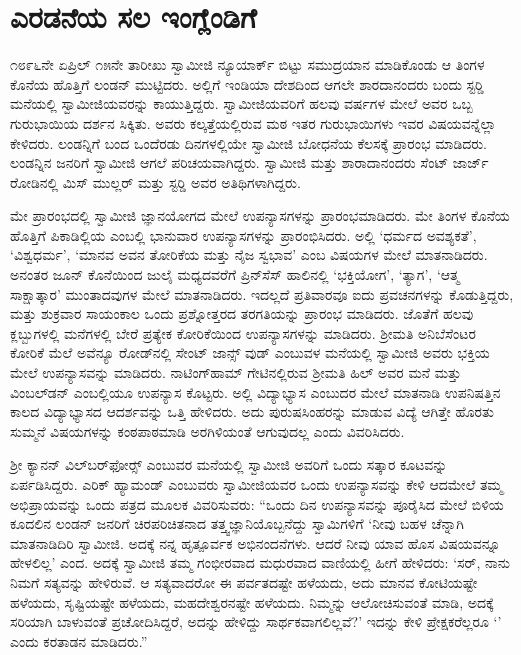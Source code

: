 
\chapter{ಎರಡನೆಯ ಸಲ ಇಂಗ್ಲೆಂಡಿಗೆ }

 ೧೮೯೬ನೇ ಏಪ್ರಿಲ್ ೧೫ನೇ ತಾರೀಖು ಸ್ವಾಮೀಜಿ ನ್ಯೂಯಾರ್ಕ್ ಬಿಟ್ಟು ಸಮುದ್ರಯಾನ ಮಾಡಿಕೊಂಡು ಆ ತಿಂಗಳ ಕೊನೆಯ ಹೊತ್ತಿಗೆ ಲಂಡನ್ ಮುಟ್ಟಿದರು. ಅಲ್ಲಿಗೆ ಇಂಡಿಯಾ ದೇಶದಿಂದ ಆಗಲೇ ಶಾರದಾನಂದರು ಬಂದು ಸ್ಟರ‍್ಡಿ ಮನೆಯಲ್ಲಿ ಸ್ವಾಮೀಜಿಯವರನ್ನು ಕಾಯುತ್ತಿದ್ದರು. ಸ್ವಾಮೀಜಿಯವರಿಗೆ ಹಲವು ವರ್ಷಗಳ ಮೇಲೆ ಅವರ ಒಬ್ಬ ಗುರುಭಾಯಿಯ ದರ್ಶನ ಸಿಕ್ಕಿತು. ಅವರು ಕಲ್ಕತ್ತೆಯಲ್ಲಿರುವ ಮಠ ಇತರ ಗುರುಭಾಯಿಗಳು ಇವರ ವಿಷಯವನ್ನೆಲ್ಲಾ ಕೇಳಿದರು. ಲಂಡನ್ನಿಗೆ ಬಂದ ಒಂದೆರಡು ದಿನಗಳಲ್ಲಿಯೇ ಸ್ವಾಮೀಜಿ ಬೋಧನೆಯ ಕೆಲಸಕ್ಕೆ ಪ್ರಾರಂಭ ಮಾಡಿದರು. ಲಂಡನ್ನಿನ ಜನರಿಗೆ ಸ್ವಾಮೀಜಿ ಆಗಲೆ ಪರಿಚಯವಾಗಿದ್ದರು. ಸ್ವಾಮೀಜಿ ಮತ್ತು ಶಾರಾದಾನಂದರು ಸೆಂಟ್ ಜಾರ್ಜ್ ರೋಡಿನಲ್ಲಿ ಮಿಸ್ ಮುಲ್ಲರ್ ಮತ್ತು ಸ್ಟರ‍್ಡಿ ಅವರ ಅತಿಥಿಗಳಾಗಿದ್ದರು. 

 ಮೇ ಪ್ರಾರಂಭದಲ್ಲಿ ಸ್ವಾಮೀಜಿ ಜ್ಞಾನಯೋಗದ ಮೇಲೆ ಉಪನ್ಯಾಸಗಳನ್ನು ಪ್ರಾರಂಭಮಾಡಿದರು. ಮೇ ತಿಂಗಳ ಕೊನೆಯ ಹೊತ್ತಿಗೆ ಪಿಕಾಡಿಲ್ಲಿಯ  ಎಂಬಲ್ಲಿ ಭಾನುವಾರ ಉಪನ್ಯಾಸಗಳನ್ನು ಪ್ರಾರಂಭಿಸಿದರು. ಅಲ್ಲಿ ‘ಧರ್ಮದ ಅವಶ್ಯಕತೆ’, ‘ವಿಶ್ವಧರ್ಮ’, ‘ಮಾನವ ಅವನ ತೋರಿಕೆಯ ಮತ್ತು ನೈಜ ಸ್ವಭಾವ’ ಎಂಬ ವಿಷಯಗಳ ಮೇಲೆ ಮಾತನಾಡಿದರು. ಅನಂತರ ಜೂನ್ ಕೊನೆಯಿಂದ ಜುಲೈ ಮಧ್ಯದವರೆಗೆ ಪ್ರಿನ್‍ಸೆಸ್ ಹಾಲಿನಲ್ಲಿ ‘ಭಕ್ತಿಯೋಗ’, ‘ತ್ಯಾಗ’, ‘ಆತ್ಮ ಸಾಕ್ಷಾತ್ಕಾರ’ ಮುಂತಾದವುಗಳ ಮೇಲೆ ಮಾತನಾಡಿದರು. ಇದಲ್ಲದೆ ಪ್ರತಿವಾರವೂ ಐದು ಪ್ರವಚನಗಳನ್ನು ಕೊಡುತ್ತಿದ್ದರು, ಮತ್ತು ಶುಕ್ರವಾರ ಸಾಯಂಕಾಲ ಒಂದು ಪ್ರಶ್ನೋತ್ತರದ ತರಗತಿಯನ್ನು ಪ್ರಾರಂಭ ಮಾಡಿದರು. ಜೊತೆಗೆ ಹಲವು ಕ್ಲಬ್ಬುಗಳಲ್ಲಿ ಮನೆಗಳಲ್ಲಿ ಬೇರೆ ಪ್ರತ್ಯೇಕ ಕೋರಿಕೆಯಿಂದ ಉಪನ್ಯಾಸಗಳನ್ನು ಮಾಡಿದರು. ಶ‍್ರೀಮತಿ ಅನಿಬೆಸೆಂಟರ ಕೋರಿಕೆ ಮೆಲೆ ಅವೆನ್ಯೂ ರೋಡ್‍ನಲ್ಲಿ ಸೇಂಟ್ ಜಾನ್ಸ್ ವುಡ್ ಎಂಬುವಳ ಮನೆಯಲ್ಲಿ ಸ್ವಾಮೀಜಿ ಅವರು ಭಕ್ತಿಯ ಮೇಲೆ ಉಪನ್ಯಾಸವನ್ನು ಮಾಡಿದರು. ನಾಟಿಂಗ್‍ಹಾಮ್ ಗೇಟಿನಲ್ಲಿರುವ ಶ‍್ರೀಮತಿ ಹಿಲ್ ಅವರ ಮನೆ ಮತ್ತು ವಿಂಬಲ್‍ಡನ್ ಎಂಬಲ್ಲಿಯೂ ಉಪನ್ಯಾಸ ಕೊಟ್ಟರು. ಅಲ್ಲಿ ವಿದ್ಯಾಭ್ಯಾಸ ಎಂಬುದರ ಮೇಲೆ ಮಾತನಾಡಿ ಉಪನಿಷತ್ತಿನ ಕಾಲದ ವಿದ್ಯಾಭ್ಯಾಸದ ಆದರ್ಶವನ್ನು ಒತ್ತಿ ಹೇಳಿದರು. ಅದು ಪುರುಷಸಿಂಹರನ್ನು ಮಾಡುವ ವಿದ್ಯೆ ಆಗಿತ್ತೇ ಹೊರತು ಸುಮ್ಮನೆ ವಿಷಯಗಳನ್ನು ಕಂಠಪಾಠಮಾಡಿ ಅರಗಿಳಿಯಂತೆ ಆಗುವುದಲ್ಲ ಎಂದು ವಿವರಿಸಿದರು. 

 ಶ‍್ರೀ ಕ್ಯಾನನ್ ವಿಲ್‌ಬರ್‌ಫೋರ್ಸ್‍ ಎಂಬುವರ ಮನೆಯಲ್ಲಿ ಸ್ವಾಮೀಜಿ ಅವರಿಗೆ ಒಂದು ಸತ್ಕಾರ ಕೂಟವನ್ನು ಏರ್ಪಡಿಸಿದ್ದರು. ಎರಿಕ್ ಹ್ಯಾಮಂಡ್ ಎಂಬುವರು ಸ್ವಾಮೀಜಿಯವರ ಒಂದು ಉಪನ್ಯಾಸವನ್ನು ಕೇಳಿ ಆದಮೇಲೆ ತಮ್ಮ ಅಭಿಪ್ರಾಯವನ್ನು ಒಂದು ಪತ್ರದ ಮೂಲಕ ವಿವರಿಸುವರು: “ಒಂದು ದಿನ ಉಪನ್ಯಾಸವನ್ನು ಪೂರೈಸಿದ ಮೇಲೆ ಬಿಳಿಯ ಕೂದಲಿನ ಲಂಡನ್ ಜನರಿಗೆ ಚಿರಪರಿಚಿತನಾದ ತತ್ತ್ವಜ್ಞಾನಿಯೊಬ್ಬನೆದ್ದು ಸ್ವಾಮಿಗಳಿಗೆ ‘ನೀವು ಬಹಳ ಚೆನ್ನಾಗಿ ಮಾತನಾಡಿದಿರಿ ಸ್ವಾಮೀಜಿ. ಅದಕ್ಕೆ ನನ್ನ ಹೃತ್ಪೂರ್ವಕ ಅಭಿನಂದನೆಗಳು. ಆದರೆ ನೀವು ಯಾವ ಹೊಸ ವಿಷಯವನ್ನೂ ಹೇಳಲಿಲ್ಲ’ ಎಂದ. ಅದಕ್ಕೆ ಸ್ವಾಮೀಜಿ ತಮ್ಮ ಗಂಭೀರವಾದ ಮಧುರವಾದ ವಾಣಿಯಲ್ಲಿ ಹೀಗೆ ಹೇಳಿದರು: ‘ಸರ್, ನಾನು ನಿಮಗೆ ಸತ್ಯವನ್ನು ಹೇಳಿರುವೆ. ಆ ಸತ್ಯವಾದರೋ ಈ ಪರ್ವತದಷ್ಟೇ ಹಳೆಯದು, ಅದು ಮಾನವ ಕೋಟಿಯಷ್ಟೇ ಹಳೆಯದು, ಸೃಷ್ಟಿಯಷ್ಟೇ ಹಳೆಯದು, ಮಹದೇಶ್ವರನಷ್ಟೇ ಹಳೆಯದು. ನಿಮ್ಮನ್ನು ಆಲೋಚಿಸುವಂತೆ ಮಾಡಿ, ಅದಕ್ಕೆ ಸರಿಯಾಗಿ ಬಾಳುವಂತೆ ಪ್ರಚೋದಿಸಿದ್ದರೆ, ಅದನ್ನು ಹೇಳಿದ್ದು ಸಾರ್ಥಕವಾಗಲಿಲ್ಲವೆ?’ ಇದನ್ನು ಕೇಳಿ ಪ್ರೇಕ್ಷಕರೆಲ್ಲರೂ ‘’ ಎಂದು ಕರತಾಡನ ಮಾಡಿದರು.” 

